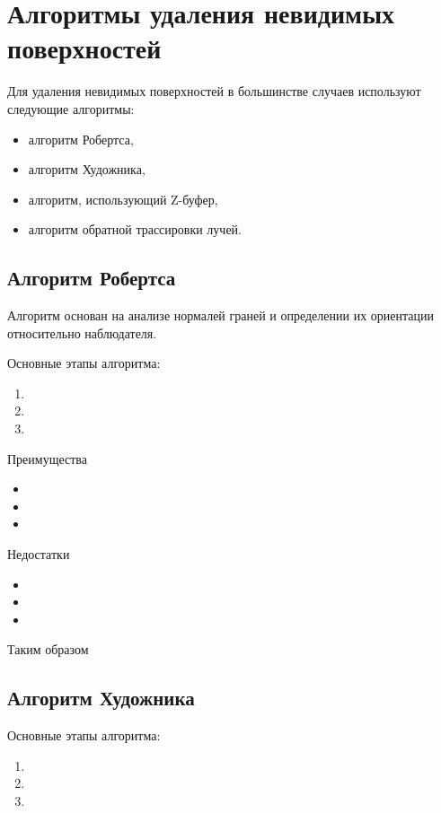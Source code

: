 \section{Алгоритмы удаления невидимых поверхностей}

Для удаления невидимых поверхностей в большинстве случаев используют следующие алгоритмы:

\begin{itemize}
	\item алгоритм Робертса,
	\item алгоритм Художника,
	\item алгоритм, использующий Z-буфер,
	\item алгоритм обратной трассировки лучей.
\end{itemize}

\subsection{Алгоритм Робертса}

Алгоритм основан на анализе нормалей граней и определении их ориентации относительно наблюдателя.

Основные этапы алгоритма:
\begin{enumerate}
	\item 
	\item 
	\item
\end{enumerate}

Преимущества

\begin{itemize}
	\item 
	\item 
	\item
\end{itemize}

Недостатки

\begin{itemize}
	\item 
	\item 
	\item
\end{itemize}

Таким образом

\subsection{Алгоритм Художника}

Основные этапы алгоритма:
\begin{enumerate}
	\item 
	\item 
	\item
\end{enumerate}

